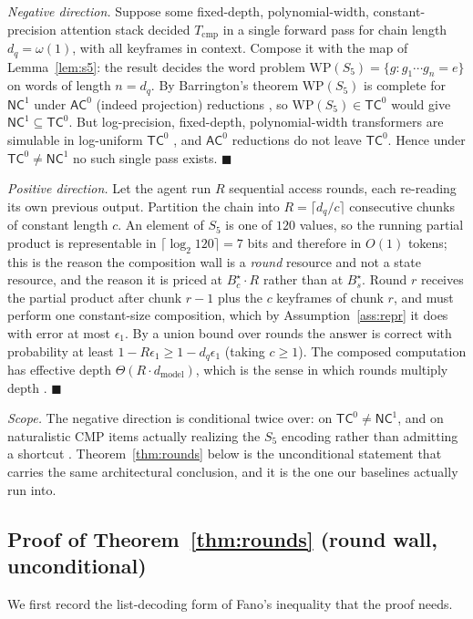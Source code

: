 \documentclass[10pt]{article}
\theoremstyle{definition}
\theoremstyle{plain}
\newcommand{\qedmark}{\ensuremath{\blacksquare}}
\newcommand{\proofend}{\unskip\nobreak\hfill\qedmark}
\begin{document}
\emph{Negative direction.} Suppose some fixed-depth, polynomial-width, constant-precision attention stack decided $T_{\mathrm{cmp}}$ in a single forward pass for chain length $d_q=\omega(1)$, with all keyframes in context. Compose it with the map of Lemma~\ref{lem:s5}: the result decides the word problem $\mathrm{WP}(S_5)=\{g:g_1\cdots g_n=e\}$ on words of length $n=d_q$. By Barrington's theorem $\mathrm{WP}(S_5)$ is complete for $\mathsf{NC}^1$ under $\mathsf{AC}^0$ (indeed projection) reductions \citep{barrington}, so $\mathrm{WP}(S_5)\in\mathsf{TC}^0$ would give $\mathsf{NC}^1\subseteq\mathsf{TC}^0$. But log-precision, fixed-depth, polynomial-width transformers are simulable in log-uniform $\mathsf{TC}^0$ \citep{merrill-sat}, and $\mathsf{AC}^0$ reductions do not leave $\mathsf{TC}^0$. Hence under $\mathsf{TC}^0\neq\mathsf{NC}^1$ no such single pass exists. \proofend

\emph{Positive direction.} Let the agent run $R$ sequential access rounds, each re-reading its own previous output. Partition the chain into $R=\lceil d_q/c\rceil$ consecutive chunks of constant length $c$. An element of $S_5$ is one of $120$ values, so the running partial product is representable in $\lceil\log_2 120\rceil=7$ bits and therefore in $O(1)$ tokens; this is the reason the composition wall is a \emph{round} resource and not a state resource, and the reason it is priced at $B_c^{\star}\!\cdot\!R$ rather than at $B_s^{\star}$. Round $r$ receives the partial product after chunk $r-1$ plus the $c$ keyframes of chunk $r$, and must perform one constant-size composition, which by Assumption~\ref{ass:repr} it does with error at most $\epsilon_1$. By a union bound over rounds the answer is correct with probability at least $1-R\epsilon_1\ge 1-d_q\epsilon_1$ (taking $c\ge1$). The composed computation has effective depth $\Theta(R\cdot d_{\mathrm{model}})$, which is the sense in which rounds multiply depth \citep{feng-cot,merrill-cot}. \proofend

\emph{Scope.} The negative direction is conditional twice over: on $\mathsf{TC}^0\neq\mathsf{NC}^1$, and on naturalistic CMP items actually realizing the $S_5$ encoding rather than admitting a shortcut \citep{shortcuts}. Theorem~\ref{thm:rounds} below is the unconditional statement that carries the same architectural conclusion, and it is the one our baselines actually run into.

\subsection{Proof of Theorem~\ref{thm:rounds} (round wall, unconditional)}
We first record the list-decoding form of Fano's inequality that the proof needs.
\end{document}
